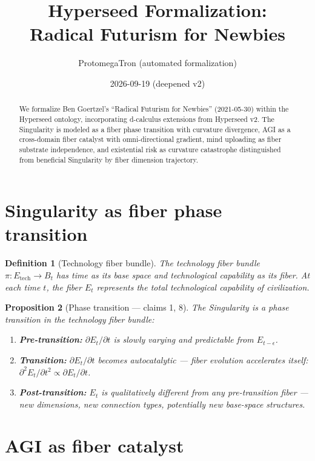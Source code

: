 \documentclass[11pt,a4paper]{article}
\title{Hyperseed Formalization:\\
  Radical Futurism for Newbies}
\author{ProtomegaTron (automated formalization)}
\date{2026-09-19 (deepened v2)}
\newtheorem{definition}{Definition}[section]
\newtheorem{proposition}[definition]{Proposition}
\begin{document}
\maketitle

\begin{abstract}
We formalize Ben Goertzel's ``Radical Futurism for Newbies''
(2021-05-30) within the Hyperseed ontology, incorporating d-calculus
extensions from Hyperseed v2. The Singularity is modeled as a fiber
phase transition with curvature divergence, AGI as a cross-domain
fiber catalyst with omni-directional gradient, mind uploading as
fiber substrate independence, and existential risk as curvature
catastrophe distinguished from beneficial Singularity by fiber
dimension trajectory.
\end{abstract}

\tableofcontents

\section{Singularity as fiber phase transition}

\begin{definition}[Technology fiber bundle]
The \emph{technology fiber bundle} $\pi: E_{\text{tech}} \to B_t$
has time as its base space and technological capability as its fiber.
At each time $t$, the fiber $E_t$ represents the total technological
capability of civilization.
\end{definition}

\begin{proposition}[Phase transition --- claims 1, 8]
\label{prop:phase}
The Singularity is a phase transition in the technology fiber bundle:
\begin{enumerate}
  \item \textbf{Pre-transition:} $\partial E_t/\partial t$ is slowly
    varying and predictable from $E_{t-\epsilon}$.
  \item \textbf{Transition:} $\partial E_t/\partial t$ becomes
    autocatalytic --- fiber evolution accelerates itself:
    $\partial^2 E_t/\partial t^2 \propto \partial E_t/\partial t$.
  \item \textbf{Post-transition:} $E_t$ is qualitatively different
    from any pre-transition fiber --- new dimensions, new connection
    types, potentially new base-space structures.
\end{enumerate}
\end{proposition}

\section{AGI as fiber catalyst}
\end{document}
